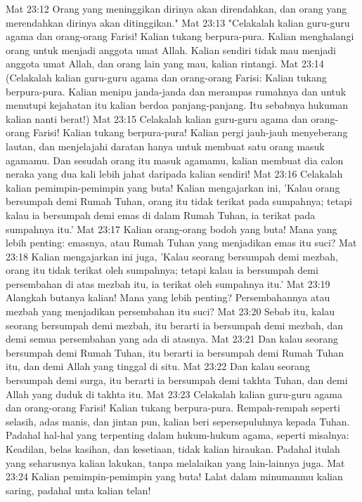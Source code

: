 Mat 23:12  Orang yang meninggikan dirinya akan direndahkan, dan orang yang merendahkan dirinya akan ditinggikan."
Mat 23:13  "Celakalah kalian guru-guru agama dan orang-orang Farisi! Kalian tukang berpura-pura. Kalian menghalangi orang untuk menjadi anggota umat Allah. Kalian sendiri tidak mau menjadi anggota umat Allah, dan orang lain yang mau, kalian rintangi.
Mat 23:14  (Celakalah kalian guru-guru agama dan orang-orang Farisi: Kalian tukang berpura-pura. Kalian menipu janda-janda dan merampas rumahnya dan untuk menutupi kejahatan itu kalian berdoa panjang-panjang. Itu sebabnya hukuman kalian nanti berat!)
Mat 23:15  Celakalah kalian guru-guru agama dan orang-orang Farisi! Kalian tukang berpura-pura! Kalian pergi jauh-jauh menyeberang lautan, dan menjelajahi daratan hanya untuk membuat satu orang masuk agamamu. Dan sesudah orang itu masuk agamamu, kalian membuat dia calon neraka yang dua kali lebih jahat daripada kalian sendiri!
Mat 23:16  Celakalah kalian pemimpin-pemimpin yang buta! Kalian mengajarkan ini, 'Kalau orang bersumpah demi Rumah Tuhan, orang itu tidak terikat pada sumpahnya; tetapi kalau ia bersumpah demi emas di dalam Rumah Tuhan, ia terikat pada sumpahnya itu.'
Mat 23:17  Kalian orang-orang bodoh yang buta! Mana yang lebih penting: emasnya, atau Rumah Tuhan yang menjadikan emas itu suci?
Mat 23:18  Kalian mengajarkan ini juga, 'Kalau seorang bersumpah demi mezbah, orang itu tidak terikat oleh sumpahnya; tetapi kalau ia bersumpah demi persembahan di atas mezbah itu, ia terikat oleh sumpahnya itu.'
Mat 23:19  Alangkah butanya kalian! Mana yang lebih penting? Persembahannya atau mezbah yang menjadikan persembahan itu suci?
Mat 23:20  Sebab itu, kalau seorang bersumpah demi mezbah, itu berarti ia bersumpah demi mezbah, dan demi semua persembahan yang ada di atasnya.
Mat 23:21  Dan kalau seorang bersumpah demi Rumah Tuhan, itu berarti ia bersumpah demi Rumah Tuhan itu, dan demi Allah yang tinggal di situ.
Mat 23:22  Dan kalau seorang bersumpah demi surga, itu berarti ia bersumpah demi takhta Tuhan, dan demi Allah yang duduk di takhta itu.
Mat 23:23  Celakalah kalian guru-guru agama dan orang-orang Farisi! Kalian tukang berpura-pura. Rempah-rempah seperti selasih, adas manis, dan jintan pun, kalian beri sepersepuluhnya kepada Tuhan. Padahal hal-hal yang terpenting dalam hukum-hukum agama, seperti misalnya: Keadilan, belas kasihan, dan kesetiaan, tidak kalian hiraukan. Padahal itulah yang seharusnya kalian lakukan, tanpa melalaikan yang lain-lainnya juga.
Mat 23:24  Kalian pemimpin-pemimpin yang buta! Lalat dalam minumanmu kalian saring, padahal unta kalian telan!
